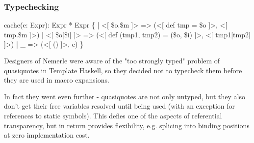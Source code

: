 \documentclass[hyperref={bookmarks=false}]{beamer}
\begin{document}
\begin{frame}[fragile]
\frametitle{Typechecking}

\begin{lstlistinglike}
\begin{semiverbatim}
cache(e: Expr): Expr * Expr \{
  | <[ \$o.\$m ]> => (<[ def tmp = \$o ]>, <[ tmp.\$m ]>)
  | <[ \$o[\$i] ]> => (<[ def (tmp1, tmp2) = (\$o, \$i) ]>,
                     <[ tmp1[tmp2] ]>)
  | _ => (<[ () ]>, e)
\}
\end{semiverbatim}
\end{lstlistinglike}

Designers of Nemerle were aware of the "too strongly typed" problem of quasiquotes
in Template Haskell, so they decided not to typecheck them before they are used
in macro expansions.

In fact they went even further - quasiquotes are not only untyped, but they also
don't get their free variables resolved until being used (with an exception for
references to static symbols). This defies one of the aspects of referential transparency,
but in return provides flexibility, e.g. splicing into binding positions at zero implementation cost.
\end{frame}
\end{document}
